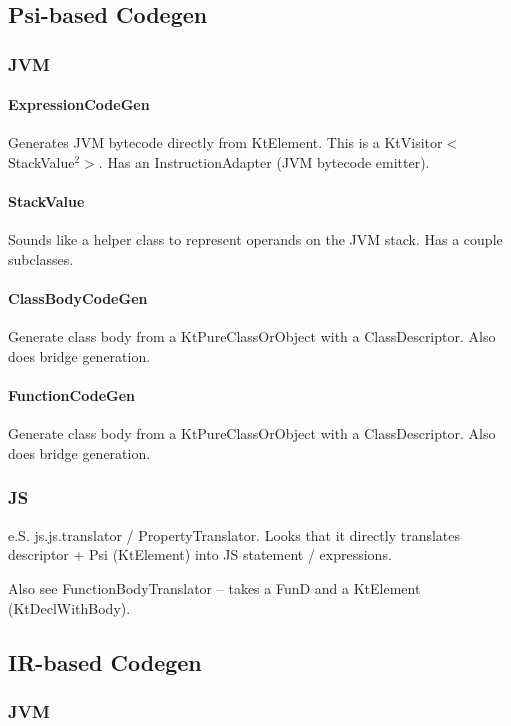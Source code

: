 \documentclass{article}
\begin{document}
\subsection{Psi-based Codegen}

\subsubsection{JVM}

\paragraph{ExpressionCodeGen}
Generates JVM bytecode directly from KtElement. This is a KtVisitor$<$StackValue$^2$$>$. Has an InstructionAdapter (JVM bytecode emitter).

\paragraph{StackValue}
Sounds like a helper class to represent operands on the JVM stack. Has a couple subclasses.

\paragraph{ClassBodyCodeGen}
Generate class body from a KtPureClassOrObject with a ClassDescriptor. Also does bridge generation.

\paragraph{FunctionCodeGen}
Generate class body from a KtPureClassOrObject with a ClassDescriptor. Also does bridge generation.

\subsubsection{JS}

e.S. js.js.translator / PropertyTranslator. Looks that it directly translates descriptor + Psi (KtElement) into JS statement / expressions.

Also see FunctionBodyTranslator -- takes a FunD and a KtElement (KtDeclWithBody).

\subsection{IR-based Codegen}

\subsubsection{JVM}
\end{document}
